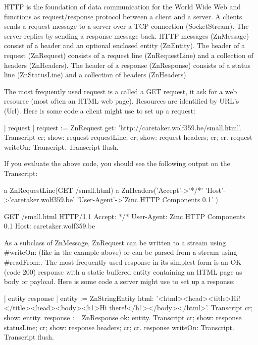 \documentclass[a4paper,10pt,twoside]{book}
\begin{document}
HTTP is the foundation of data communication for the World Wide Web and functions as request/response protocol between a client and a server. A clients sends a request message to a server over a TCP connection (SocketStream). The server replies by sending a response message back. HTTP messages (ZnMessage) consist of a header and an optional enclosed entity (ZnEntity). The header of a request (ZnRequest) consists of a request line (ZnRequestLine) and a collection of headers (ZnHeaders). The header of a response (ZnResponse) consists of a status line (ZnStatusLine) and a collection of headers (ZnHeaders).

The most frequently used request is a called a GET request, it ask for a web resource (most often an HTML web page). Resources are identified by URL's (Url). Here is some code a client might use to set up a request:

\begin{code}{}
| request |
request := ZnRequest get: 'http://caretaker.wolf359.be/small.html'.
Transcript 
  cr; show: request requestLine;
  cr; show: request headers;
  cr; cr.
request writeOn: Transcript.
Transcript flush.
\end{code}  

If you evaluate the above code, you should see the following output on the Transcript:
\begin{code}{}
a ZnRequestLine(GET /small.html)
a ZnHeaders('Accept'->'*/*' 'Host'->'caretaker.wolf359.be' 'User-Agent'->'Zinc HTTP Components 0.1' )

GET /small.html HTTP/1.1
Accept: */*
User-Agent: Zinc HTTP Components 0.1
Host: caretaker.wolf359.be
\end{code}
As a subclass of ZnMessage, ZnRequest can be written to a stream using #writeOn: (like in the example above) or can be parsed from a stream using #readFrom:. The most frequently used response in its simplest form is an OK (code 200) response with a static buffered entity containing an HTML page as body or payload. Here is some code a server might use to set up a response:

\begin{code}{}
| entity response |
entity := ZnStringEntity html: '<html><head><title>Hi!</title><head><body><h1>Hi there!</h1></body></html>'.
Transcript
  cr; show: entity.
response := ZnResponse ok: entity.
Transcript 
  cr; show: response statusLine;
  cr; show: response headers;
  cr; cr.
response writeOn: Transcript.
Transcript flush.
\end{code}
\end{document}
